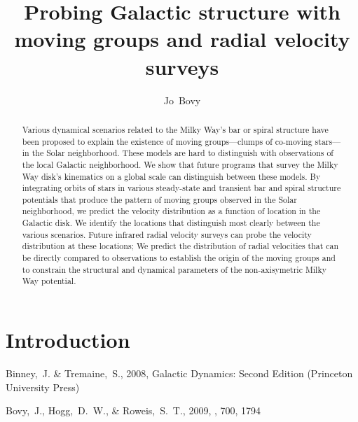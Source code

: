 \documentclass[12pt,preprint]{aastex}
\begin{document}
\title{Probing Galactic structure with moving groups and radial velocity surveys}
\author{Jo~Bovy}%

\begin{abstract}
Various dynamical scenarios related to the Milky Way's bar or spiral
structure have been proposed to explain the existence of moving
groups---clumps of co-moving stars---in the Solar neighborhood. These
models are hard to distinguish with observations of the local Galactic
neighborhood. We show that future programs that survey the Milky Way
disk's kinematics on a global scale can distinguish between these
models. By integrating orbits of stars in various steady-state and
transient bar and spiral structure potentials that produce the pattern
of moving groups observed in the Solar neighborhood, we predict the
velocity distribution as a function of location in the Galactic
disk. We identify the locations that distinguish most clearly between
the various scenarios. Future infrared radial velocity surveys can
probe the velocity distribution at these locations; We predict the
distribution of radial velocities that can be directly compared to
observations to establish the origin of the moving groups and to
constrain the structural and dynamical parameters of the
non-axisymetric Milky Way potential.
\end{abstract}


\section{Introduction}





\begin{thebibliography}{}

{Binney},~J. \& {Tremaine},~S., 2008, {Galactic Dynamics: Second Edition}
  (Princeton University Press)

 Bovy,~J., Hogg,~D.~W., \& Roweis,~S.~T., 2009,
  \apj, 700, 1794

\end{thebibliography}
\end{document}
